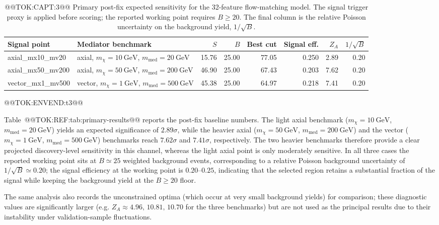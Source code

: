 \documentclass[11pt]{article}
\newcommand{\GeV}{\text{GeV}}
\begin{document}
\begin{table}[t]
  \centering
  \caption{@@TOK:CAPT:3@@ Primary post-fix expected sensitivity for the 32-feature
  flow-matching model. The signal trigger proxy is applied before scoring; the
  reported working point requires $B\geq20$. The final column is the relative
  Poisson uncertainty on the background yield, $1/\sqrt{B}$.}
  \label{tab:primary-results}
  \begin{tabular}{>{\raggedright\arraybackslash}p{3.1cm}>{\raggedright\arraybackslash}p{3.0cm}rrrrrr}
    \toprule
    Signal point & Mediator benchmark & $S$ & $B$ & Best cut & Signal eff. & $Z_A$ & $1/\sqrt{B}$ \\
    \midrule
    axial\_mx10\_mv20 & axial, $m_\chi=10~\GeV$, $m_\mathrm{med}=20~\GeV$
      & 15.76 & 25.00 & 77.05 & 0.250 & 2.89 & 0.20 \\
    axial\_mx50\_mv200 & axial, $m_\chi=50~\GeV$, $m_\mathrm{med}=200~\GeV$
      & 46.90 & 25.00 & 67.43 & 0.203 & 7.62 & 0.20 \\
    vector\_mx1\_mv500 & vector, $m_\chi=1~\GeV$, $m_\mathrm{med}=500~\GeV$
      & 45.38 & 25.00 & 64.97 & 0.218 & 7.41 & 0.20 \\
    \bottomrule
  \end{tabular}
@@TOK:ENVEND:t3@@\end{table}

Table~@@TOK:REF:tab:primary-results@@ reports the post-fix baseline numbers. The
light axial benchmark ($m_\chi=10~\GeV$, $m_{\mathrm{med}}=20~\GeV$) yields
an expected significance of $2.89\sigma$, while the heavier axial
($m_\chi=50~\GeV$, $m_{\mathrm{med}}=200~\GeV$) and the vector
($m_\chi=1~\GeV$, $m_{\mathrm{med}}=500~\GeV$) benchmarks reach
$7.62\sigma$ and $7.41\sigma$, respectively. The two heavier benchmarks
therefore provide a clear projected discovery-level sensitivity in this
channel, whereas the light axial point is only moderately sensitive. In all
three cases the reported working point sits at $B\simeq25$ weighted
background events, corresponding to a relative Poisson background
uncertainty of $1/\sqrt{B}\simeq0.20$; the signal efficiency at the working
point is $0.20$--$0.25$, indicating that the selected region retains a
substantial fraction of the signal while keeping the background yield at the
$B\geq20$ floor.

The same analysis also records the unconstrained optima (which occur at very
small background yields) for comparison; these diagnostic values are
significantly larger (e.g. $Z_A\approx4.96,\,10.81,\,10.70$ for the three
benchmarks) but are not used as the principal results due to their
instability under validation-sample fluctuations.
\end{document}
